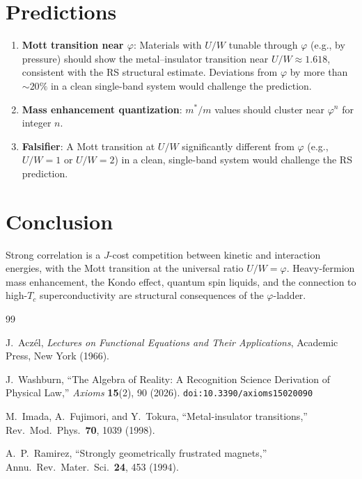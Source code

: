 \documentclass[12pt,a4paper]{article}
\theoremstyle{definition}
\theoremstyle{remark}
\begin{document}
\section{Predictions}
\label{sec:predictions}

\begin{enumerate}
  \item \textbf{Mott transition near $\varphi$}: Materials with
  $U/W$ tunable through $\varphi$ (e.g., by pressure) should
  show the metal--insulator transition near $U/W \approx 1.618$,
  consistent with the RS structural estimate.  Deviations from
  $\varphi$ by more than $\sim 20\%$ in a clean single-band
  system would challenge the prediction.

  \item \textbf{Mass enhancement quantization}: $m^*/m$ values
  should cluster near $\varphi^n$ for integer $n$.

  \item \textbf{Falsifier}: A Mott transition at $U/W$
  significantly different from $\varphi$ (e.g., $U/W = 1$ or
  $U/W = 2$) in a clean, single-band system would challenge the
  RS prediction.
\end{enumerate}

\section{Conclusion}
\label{sec:conclusion}

Strong correlation is a $J$-cost competition between kinetic and
interaction energies, with the Mott transition at the universal
ratio $U/W = \varphi$.  Heavy-fermion mass enhancement, the Kondo
effect, quantum spin liquids, and the connection to high-$T_c$
superconductivity are structural consequences of the $\varphi$-ladder.

\begin{thebibliography}{99}

J.~Acz\'el, \emph{Lectures on Functional Equations and Their Applications},
Academic Press, New York (1966).

J.~Washburn, ``The Algebra of Reality: A Recognition Science Derivation
of Physical Law,'' \emph{Axioms} \textbf{15}(2), 90 (2026).
\texttt{doi:10.3390/axioms15020090}

M.~Imada, A.~Fujimori, and Y.~Tokura, ``Metal-insulator
transitions,'' Rev.\ Mod.\ Phys.\ \textbf{70}, 1039 (1998).

A.~P.~Ramirez, ``Strongly geometrically frustrated magnets,''
Annu.\ Rev.\ Mater.\ Sci.\ \textbf{24}, 453 (1994).

\end{thebibliography}
\end{document}
